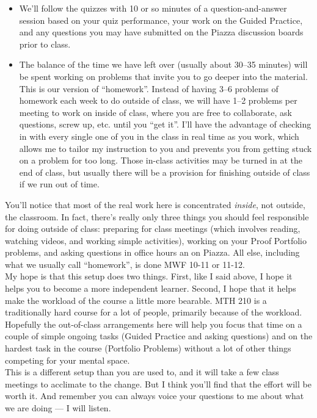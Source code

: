 \documentclass[11pt]{article}
\begin{document}
\begin{itemize}[itemsep=0pt]
		\item We'll follow the quizzes with 10 or so minutes of a question-and-answer session based on your quiz performance, your work on the Guided Practice, and any questions you may have submitted on the Piazza discussion boards prior to class. 
		\item The balance of the time we have left over (usually about 30--35 minutes) will be spent working on problems that invite you to go deeper into the material. This is our version of ``homework''. Instead of having 3--6 problems of homework each week to do outside of class, we will have 1--2 problems per meeting to work on inside of class, where you are free to collaborate, ask questions, screw up, etc. until you ``get it''. I'll have the advantage of checking in with every single one of you in the class in real time as you work, which allows me to tailor my instruction to you and prevents you from getting stuck on a problem for too long. Those in-class activities may be turned in at the end of class, but usually there will be a provision for finishing outside of class if we run out of time. 
	\end{itemize}

	You'll notice that most of the real work here is concentrated \emph{inside}, not outside, the classroom. In fact, there's really only three things you should feel responsible for doing outside of class: preparing for class meetings (which involves reading, watching videos, and working simple activities), working on your Proof Portfolio problems, and asking questions in office hours an on Piazza. All else, including what we usually call ``homework'', is done MWF 10-11 or 11-12. \\

	My hope is that this setup does two things. First, like I said above, I hope it helps you to become a more independent learner. Second, I hope that it helps make the workload of the course a little more bearable. MTH 210 is a traditionally hard course for a lot of people, primarily because of the workload. Hopefully the out-of-class arrangements here will help you focus that time on a couple of simple ongoing tasks (Guided Practice and asking questions) and on the hardest task in the course (Portfolio Problems) without a lot of other things competing for your mental space. \\

	This is a different setup than you are used to, and it will take a few class meetings to acclimate to the change. But I think you'll find that the effort will be worth it. And remember you can always voice your questions to me about what we are doing --- I will listen.
	
\end{document}
